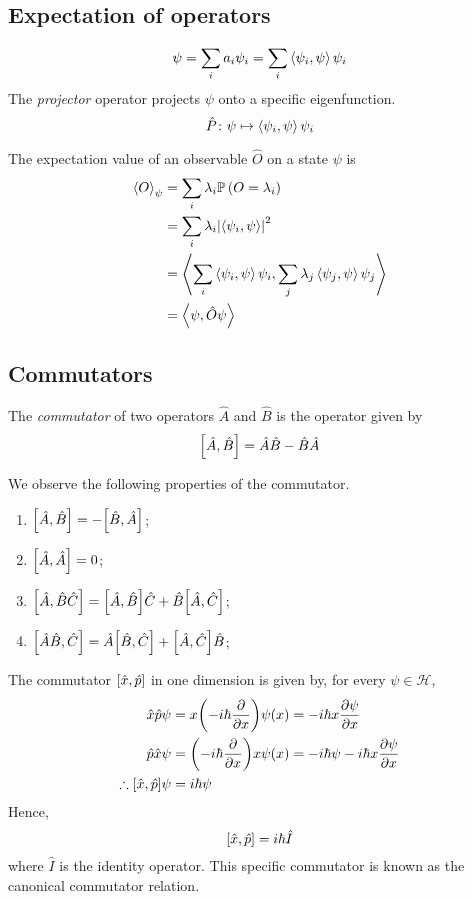 \subsection{Expectation of operators}
\begin{definition}
	\[
		\psi = \sum_i a_i \psi_i = \sum_i \left\langle{\psi_i, \psi}\right\rangle \psi_i
	\]
	The \textit{projector} operator projects \( \psi \) onto a specific eigenfunction.
	\[
		\hat P \colon \psi \mapsto \left\langle{\psi_i, \psi}\right\rangle \psi_i
	\]
\end{definition}
\begin{definition}
	The expectation value of an observable \( \hat O \) on a state \( \psi \) is
	\begin{align*}
		\left\langle{O}\right\rangle_\psi & = \sum_i \lambda_i \mathbb{P}\left({O = \lambda_i}\right)                                                    \\
		               & = \sum_i \lambda_i \abs{\left\langle{\psi_i, \psi}\right\rangle}^2                                            \\
		               & = \left\langle{\sum_i \left\langle{\psi_i, \psi}\right\rangle \psi_i, \sum_j \lambda_j \left\langle{\psi_j, \psi}\right\rangle \psi_j}\right\rangle \\
		               & = \left\langle{\psi, \hat O \psi}\right\rangle
	\end{align*}
\end{definition}

\subsection{Commutators}
\begin{definition}
	The \textit{commutator} of two operators \( \hat A \) and \( \hat B \) is the operator given by
	\[
		\qty[\hat A, \hat B] = \hat A \hat B - \hat B \hat A
	\]
\end{definition}
We observe the following properties of the commutator.
\begin{enumerate}
	\item \( \qty[\hat A, \hat B] = -\qty[\hat B, \hat A] \);
	\item \( \qty[\hat A, \hat A] = 0 \);
	\item \( \qty[\hat A, \hat B \hat C] = \qty[\hat A, \hat B] \hat C + \hat B \qty[\hat A, \hat C] \);
	\item \( \qty[\hat A \hat B, \hat C] = \hat A \qty[\hat B, \hat C] + \qty[\hat A, \hat C] \hat B \);
\end{enumerate}
\begin{example}
	The commutator \( \qty[\hat x, \hat p] \) in one dimension is given by, for every \( \psi \in \mathcal H \),
	\begin{align*}
		\hat x \hat p \psi                   & = x \qty(-i\hbar \pdv{x}) \psi(x) = -i\hbar x \pdv{\psi}{x}                 \\
		\hat p \hat x \psi                   & = \qty(-i\hbar \pdv{x}) x \psi(x) = -i \hbar \psi - i \hbar x \pdv{\psi}{x} \\
		\therefore \qty[\hat x, \hat p] \psi & = i \hbar \psi
	\end{align*}
	Hence,
	\[
		\qty[\hat x, \hat p] = i \hbar \hat I
	\]
	where \( \hat I \) is the identity operator.
	This specific commutator is known as the canonical commutator relation.
\end{example}

